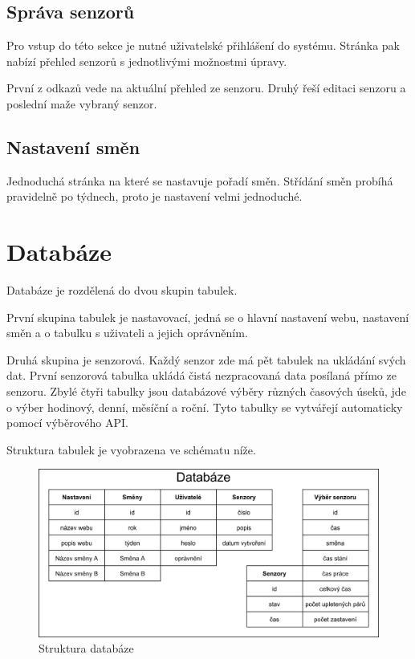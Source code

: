 \subsection{Správa senzorů}
Pro vstup do této sekce je nutné uživatelské přihlášení do systému.
Stránka pak nabízí přehled senzorů s jednotlivými možnostmi úpravy.

První z odkazů vede na aktuální přehled ze senzoru.
Druhý řeší editaci senzoru a poslední maže vybraný senzor.


\subsection{Nastavení směn}
Jednoduchá stránka na které se nastavuje pořadí směn.
Střídání směn probíhá pravidelně po týdnech, proto je nastavení velmi jednoduché.

\section{Databáze}
Databáze je rozdělená do dvou skupin tabulek.

První skupina tabulek je nastavovací, jedná se o hlavní nastavení webu, nastavení směn a o tabulku s uživateli a jejich oprávněním.

Druhá skupina je senzorová.
Každý senzor zde má pět tabulek na ukládání svých dat.
První senzorová tabulka ukládá čistá nezpracovaná data posílaná přímo ze senzoru.
Zbylé čtyři tabulky jsou databázové výběry různých časových úseků, jde o výber hodinový, denní, měsíční a roční.  
Tyto tabulky se vytvářejí automaticky pomocí výběrového API.

Struktura tabulek je vyobrazena ve schématu níže.

\begin{figure}[htbp]
    \centering
    \includegraphics[width=\textwidth]{img/Databaze.png}
    \caption{Struktura databáze}
    \label{fig:databaze}
\end{figure}






\newpage